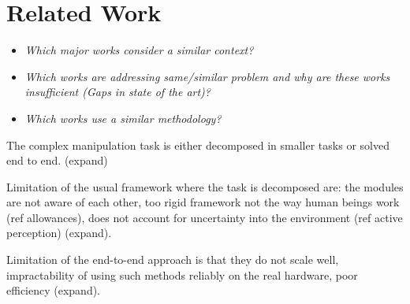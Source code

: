 \section{Related Work}
\label{sec:Related Work}

\begin{itemize}
	\item \emph{Which major works consider a similar context?}
	\item \emph{Which works are addressing same/similar problem and why are these works insufficient (Gaps in state of the art)?}
	\item \emph{Which works use a similar methodology?}
\end{itemize}

The complex manipulation task is either decomposed in smaller tasks or solved end to end. (expand)

Limitation of the usual framework where the task is decomposed are: the modules are not aware of each other, too rigid framework not the way human beings work (ref allowances), does not account for uncertainty into the environment (ref active perception) (expand). 

Limitation of the end-to-end approach is that they do not scale well, impractability of using such methods reliably on the real hardware, poor efficiency (expand).

